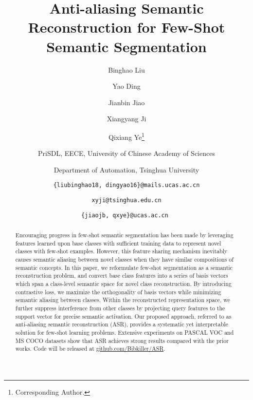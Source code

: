 \documentclass[final]{cvpr}
\begin{document}
\title{Anti-aliasing Semantic Reconstruction for Few-Shot Semantic Segmentation}

\author{Binghao Liu \and Yao Ding \and Jianbin Jiao \and Xiangyang Ji \and Qixiang Ye\thanks{Corresponding Author.}
\and PriSDL, EECE, University of Chinese Academy of Sciences\and Department of Automation, Tsinghua University

\and\tt\small \{liubinghao18, dingyao16\}@mails.ucas.ac.cn\and\tt\small xyji@tsinghua.edu.cn\and\tt\small \{jiaojb, qxye\}@ucas.ac.cn
}

\maketitle

\pagestyle{empty}  \thispagestyle{empty} \begin{abstract}
Encouraging progress in few-shot semantic segmentation has been made by leveraging features learned upon base classes with sufficient training data to represent novel classes with few-shot examples.
However, this feature sharing mechanism inevitably causes semantic aliasing between novel classes when they have similar compositions of semantic concepts.
In this paper, we reformulate few-shot segmentation as a semantic reconstruction problem, and convert base class features into a series of basis vectors which span a class-level semantic space for novel class reconstruction.
By introducing contrastive loss, we maximize the orthogonality of basis vectors while minimizing semantic aliasing between classes.
Within the reconstructed representation space, we further suppress interference from other classes by projecting query features to the support vector for precise semantic activation.
Our proposed approach, referred to as anti-aliasing semantic reconstruction (ASR), provides a systematic yet interpretable solution for few-shot learning problems.
Extensive experiments on PASCAL VOC and MS COCO datasets show that ASR achieves strong results compared with the prior works.
Code will be released at \href{https://github.com/Bibkiller/ASR}{\color{magenta}github.com/Bibkiller/ASR}.

\end{abstract}

    










{\small


}
     
    
\end{document}
